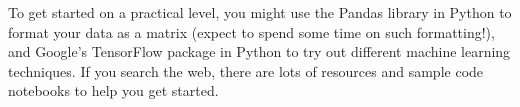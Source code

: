 To get started on a practical level, you might use the Pandas library in Python to format your data as a matrix (expect to spend some time on such formatting!), and Google's TensorFlow package in Python to try out different machine learning techniques.  If you search the web, there are lots of resources and sample code notebooks to help you get started.






